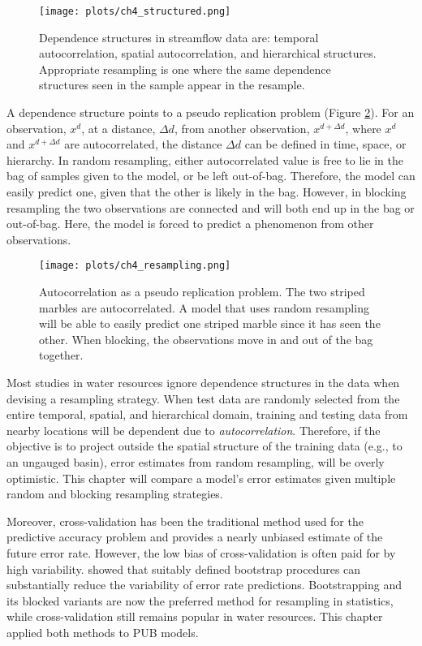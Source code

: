 \begin{figure}[ht]
	\centering
	\texttt{[image: plots/ch4\_structured.png]}
	\caption[Dependence structures in streamflow data.]{Dependence structures in streamflow data are: temporal autocorrelation, spatial autocorrelation, and hierarchical structures.  Appropriate resampling is one where the same dependence structures seen in the sample appear in the resample.} 
	\label{fig:structured}
\end{figure}

A dependence structure points to a pseudo replication problem (Figure \ref{fig:marbles}). For an observation, $x^d$, at a distance, $\Delta d$, from another observation, $x^{d+\Delta d}$, where $x^d$ and $x^{d+\Delta d}$ are autocorrelated, the distance $\Delta d$ can be defined in time, space, or hierarchy. In random resampling, either autocorrelated value is free to lie in the bag of samples given to the model, or be left out-of-bag. Therefore, the model can easily predict one, given that the other is likely in the bag. However, in blocking resampling the two observations are connected and will both end up in the bag or out-of-bag. Here, the model is forced to predict a phenomenon from other observations. 

\begin{figure}[ht]
	\centering
	\texttt{[image: plots/ch4\_resampling.png]}
	\caption[Autocorrelation as a pseudo replication problem.]{Autocorrelation as a pseudo replication problem. The two striped marbles are autocorrelated. A model that uses random resampling will be able to easily predict one striped marble since it has seen the other. When blocking, the observations move in and out of the bag together.} 
	\label{fig:marbles}
\end{figure}

Most studies in water resources ignore dependence structures in the data when devising a resampling strategy. When test data are randomly selected from the entire temporal, spatial, and hierarchical domain, training and testing data from nearby locations will be dependent due to \textit{autocorrelation}. Therefore, if the objective is to project outside the spatial structure of the training data (e.g., to an ungauged basin), error estimates from random resampling, will be overly optimistic. This chapter will compare a model's error estimates given multiple random and blocking resampling strategies. 

Moreover, cross-validation has been the traditional method used for the predictive accuracy problem and provides a nearly unbiased estimate of the future error rate. However, the low bias of cross-validation is often paid for by high variability.  showed that suitably defined bootstrap procedures can substantially reduce the variability of error rate predictions. Bootstrapping and its blocked variants are now the preferred method for resampling in statistics, while cross-validation still remains popular in water resources. This chapter applied both methods to PUB models. 

